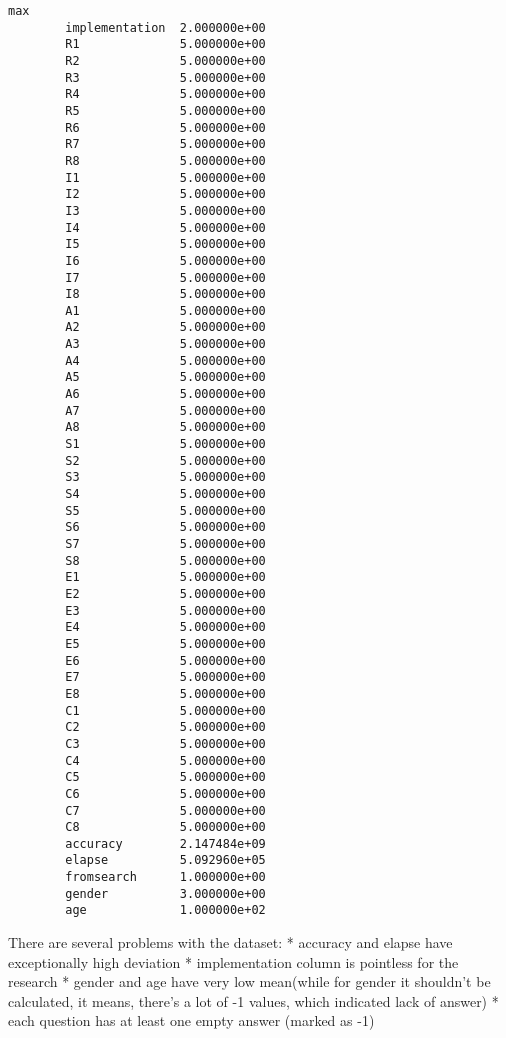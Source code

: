 \documentclass[11pt]{article}
\begin{document}
\begin{Verbatim}[commandchars=\\\{\}]
                                 max  
        implementation  2.000000e+00  
        R1              5.000000e+00  
        R2              5.000000e+00  
        R3              5.000000e+00  
        R4              5.000000e+00  
        R5              5.000000e+00  
        R6              5.000000e+00  
        R7              5.000000e+00  
        R8              5.000000e+00  
        I1              5.000000e+00  
        I2              5.000000e+00  
        I3              5.000000e+00  
        I4              5.000000e+00  
        I5              5.000000e+00  
        I6              5.000000e+00  
        I7              5.000000e+00  
        I8              5.000000e+00  
        A1              5.000000e+00  
        A2              5.000000e+00  
        A3              5.000000e+00  
        A4              5.000000e+00  
        A5              5.000000e+00  
        A6              5.000000e+00  
        A7              5.000000e+00  
        A8              5.000000e+00  
        S1              5.000000e+00  
        S2              5.000000e+00  
        S3              5.000000e+00  
        S4              5.000000e+00  
        S5              5.000000e+00  
        S6              5.000000e+00  
        S7              5.000000e+00  
        S8              5.000000e+00  
        E1              5.000000e+00  
        E2              5.000000e+00  
        E3              5.000000e+00  
        E4              5.000000e+00  
        E5              5.000000e+00  
        E6              5.000000e+00  
        E7              5.000000e+00  
        E8              5.000000e+00  
        C1              5.000000e+00  
        C2              5.000000e+00  
        C3              5.000000e+00  
        C4              5.000000e+00  
        C5              5.000000e+00  
        C6              5.000000e+00  
        C7              5.000000e+00  
        C8              5.000000e+00  
        accuracy        2.147484e+09  
        elapse          5.092960e+05  
        fromsearch      1.000000e+00  
        gender          3.000000e+00  
        age             1.000000e+02  
\end{Verbatim}
        
    There are several problems with the dataset: * accuracy and elapse have
exceptionally high deviation * implementation column is pointless for
the research * gender and age have very low mean(while for gender it
shouldn't be calculated, it means, there's a lot of -1 values, which
indicated lack of answer) * each question has at least one empty answer
(marked as -1)
\end{document}

